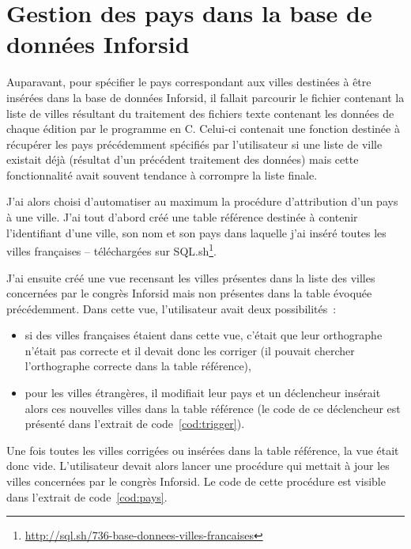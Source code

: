 		 		 
			 
		\section*{Gestion des pays dans la base de données Inforsid}
			Auparavant, pour spécifier le pays correspondant aux villes destinées à être insérées dans la base de données Inforsid, il fallait parcourir le fichier contenant la liste de villes résultant du traitement des fichiers texte contenant les données de chaque édition par le programme en C. Celui-ci contenait une fonction destinée à récupérer les pays précédemment spécifiés par l'utilisateur si une liste de ville existait déjà (résultat d'un précédent traitement des données) mais cette fonctionnalité avait souvent tendance à corrompre la liste finale.
			
			J'ai alors choisi d'automatiser au maximum la procédure d'attribution d'un pays à une ville. J'ai tout d'abord créé une table référence destinée à contenir l'identifiant d'une ville, son nom et son pays dans laquelle j'ai inséré toutes les villes françaises -- téléchargées sur SQL.sh\footnote{\url{http://sql.sh/736-base-donnees-villes-francaises}}.
			
			J'ai ensuite créé une vue recensant les villes présentes dans la liste des villes concernées par le congrès Inforsid mais non présentes dans la table évoquée précédemment. Dans cette vue, l'utilisateur avait deux possibilités~:
			\begin{itemize}
				\item si des villes françaises étaient dans cette vue, c'était que leur orthographe n'était pas correcte et il devait donc les corriger (il pouvait chercher l'orthographe correcte dans la table référence),
				\item pour les villes étrangères, il modifiait leur pays et un déclencheur insérait alors ces nouvelles villes dans  la table référence (le code de ce déclencheur est présenté dans l'extrait de code~\ref{cod:trigger}).
			\end{itemize}	
			
			
					
			Une fois toutes les villes corrigées ou insérées dans la table référence, la vue était donc vide. L'utilisateur devait alors lancer une procédure qui mettait à jour les villes concernées par le congrès Inforsid. Le code de cette procédure est visible dans l'extrait de code~\ref{cod:pays}.
			
